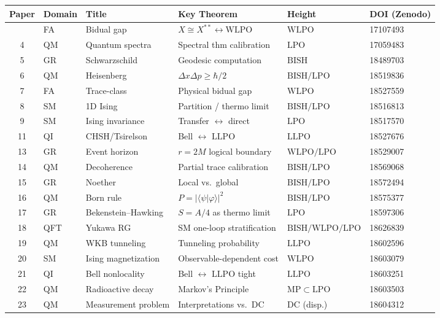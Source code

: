 \documentclass[11pt,a4paper]{report}
\theoremstyle{plain}
\theoremstyle{definition}
\theoremstyle{remark}
\newcommand{\BISH}{\mathrm{BISH}}
\newcommand{\LLPO}{\mathrm{LLPO}}
\newcommand{\WLPO}{\mathrm{WLPO}}
\newcommand{\LPO}{\mathrm{LPO}}
\newcommand{\DC}{\mathrm{DC}}
\newcommand{\MP}{\mathrm{MP}}
\begin{document}
{\small
\begin{longtable}{@{}clp{3.2cm}p{3cm}lp{2cm}@{}}
\toprule
\textbf{Paper} & \textbf{Domain} & \textbf{Title} & \textbf{Key Theorem} & \textbf{Height} & \textbf{DOI (Zenodo)} \\
\midrule
\endhead
\bottomrule
\endfoot
2  & FA  & Bidual gap          & $X \cong X^{**} \leftrightarrow \WLPO$ & $\WLPO$ & 17107493 \\
4  & QM  & Quantum spectra     & Spectral thm calibration & $\LPO$ & 17059483 \\
5  & GR  & Schwarzschild       & Geodesic computation & $\BISH$ & 18489703 \\
6  & QM  & Heisenberg          & $\Delta x\Delta p \ge \hbar/2$ & $\BISH/\LPO$ & 18519836 \\
7  & FA  & Trace-class         & Physical bidual gap & $\WLPO$ & 18527559 \\
8  & SM  & 1D Ising            & Partition / thermo limit & $\BISH/\LPO$ & 18516813 \\
9  & SM  & Ising invariance    & Transfer $\leftrightarrow$ direct & $\LPO$ & 18517570 \\
11 & QI  & CHSH/Tsirelson      & Bell $\leftrightarrow$ $\LLPO$ & $\LLPO$ & 18527676 \\
13 & GR  & Event horizon       & $r=2M$ logical boundary & $\WLPO/\LPO$ & 18529007 \\
14 & QM  & Decoherence         & Partial trace calibration & $\BISH/\LPO$ & 18569068 \\
15 & GR  & Noether             & Local vs.\ global & $\BISH/\LPO$ & 18572494 \\
16 & QM  & Born rule           & $P=|\langle\psi|\varphi\rangle|^2$ & $\BISH/\LPO$ & 18575377 \\
17 & GR  & Bekenstein--Hawking & $S=A/4$ as thermo limit & $\LPO$ & 18597306 \\
18 & QFT & Yukawa RG           & SM one-loop stratification & $\BISH/\WLPO/\LPO$ & 18626839 \\
19 & QM  & WKB tunneling       & Tunneling probability & $\LLPO$ & 18602596 \\
20 & SM  & Ising magnetization & Observable-dependent cost & $\WLPO$ & 18603079 \\
21 & QI  & Bell nonlocality    & Bell $\leftrightarrow$ $\LLPO$ tight & $\LLPO$ & 18603251 \\
22 & QM  & Radioactive decay   & Markov's Principle & $\MP \subset \LPO$ & 18603503 \\
23 & QM  & Measurement problem & Interpretations vs.\ $\DC$ & $\DC$ (disp.) & 18604312 \\

\end{longtable}}
\end{document}
